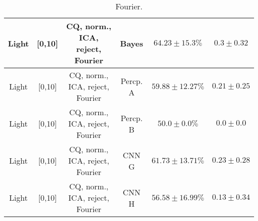 \begin{table}[!htb]
{\begin{tabular}{c|c|c|c|c|c}
    \hline
    Light               & [0,10]                                        & CQ, norm., ICA, reject, Fourier   & Bayes                 &  $64.23 \pm 15.3\%$   & $0.3 \pm 0.32$\\   
    \hline
    Light               & [0,10]                                        & CQ, norm., ICA, reject, Fourier   & Percp. A              &  $59.88 \pm 12.27\%$  & $0.21 \pm 0.25$\\  
    \hline
    Light               & [0,10]                                        & CQ, norm., ICA, reject, Fourier   & Percp. B              &  $50.0 \pm 0.0\%$     & $0.0 \pm 0.0$\\    
    \hline
    Light               & [0,10]                                        & CQ, norm., ICA, reject, Fourier   & CNN G                 &  $61.73 \pm 13.71\%$  & $0.23 \pm 0.28$\\  
    \hline
    Light               & [0,10]                                        & CQ, norm., ICA, reject, Fourier   & CNN H                 &  $56.58 \pm 16.99\%$  & $0.13 \pm 0.34$\\   
    \hline
\end{tabular}
}
\caption{Fourier.}
\label{tab:light-fourier+reject-app}
\end{table}